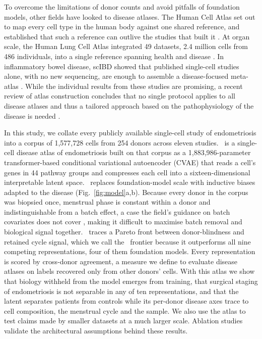 To overcome the limitations of donor counts and avoid pitfalls of 
foundation models, other fields have looked to disease atlases. 
The Human Cell Atlas set out to map every cell type in the human body 
against one shared reference, and established that such a reference can 
outlive the studies that built it \citep{regev2017hca}. At organ scale, the 
Human Lung Cell Atlas integrated 49 datasets, 2.4 million cells from 486 
individuals, into a single reference spanning health and disease 
\citep{sikkema2023hlca}. In inflammatory bowel disease, scIBD showed 
that published single-cell studies alone, with no new sequencing, are 
enough to assemble a disease-focused meta-atlas \citep{nie2023scibd}. 
While the individual results from these studies are promising, a recent
review of atlas construction concludes that no single protocol applies to
all disease atlases and thus a tailored approach based on the
pathophysiology of the disease is needed \citep{hrovatin2025atlases}. 

In this study, we collate every publicly available single-cell study of
endometriosis into a corpus of 1{,}577{,}728 cells from 254 donors across
eleven studies. \elaj\ is a single-cell disease atlas of endometriosis built
on that corpus as a 1{,}883{,}986-parameter
transformer-based conditional variational autoencoder (CVAE)
\citep{kingma2014auto, sohn2015learning} that reads a cell's genes in 44
pathway groups and compresses each cell into a sixteen-dimensional
interpretable latent space. \elaj\ replaces foundation-model scale with
inductive biases adapted to the disease (Fig.~\ref{fig:model}a,b). Because
every donor in the corpus was biopsied once, menstrual phase is constant
within a donor and indistinguishable from a batch effect, a case the
field's guidance on batch covariates does not cover
\citep{hrovatin2025atlases}, making it difficult to maximise batch removal
and biological signal together. \elaj\ traces a Pareto front between
donor-blindness and retained cycle signal, which we call the \elaj\
frontier because it outperforms all nine competing representations, four
of them foundation models. Every representation is scored by cross-donor
agreement, a measure we define to evaluate disease atlases on labels recovered
only from other donors' cells. With this atlas we show that biology
withheld from the model emerges from training, that surgical staging of
endometriosis is not separable in any of ten representations, and that the
latent separates patients from controls while its per-donor disease axes
trace to cell composition, the menstrual cycle and the sample. We also use
the atlas to test claims made by smaller datasets at a much larger scale.
Ablation studies validate the architectural assumptions behind these results.